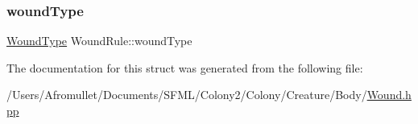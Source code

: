 \subsubsection{\texorpdfstring{wound\+Type}{woundType}}
{\footnotesize\ttfamily \mbox{\hyperlink{_enum_types_8hpp_a585daaeecd1f9f1350c24bf0081a734e}{Wound\+Type}} Wound\+Rule\+::wound\+Type}



The documentation for this struct was generated from the following file\+:\begin{DoxyCompactItemize}
\item 
/\+Users/\+Afromullet/\+Documents/\+S\+F\+M\+L/\+Colony2/\+Colony/\+Creature/\+Body/\mbox{\hyperlink{_wound_8hpp}{Wound.\+hpp}}\end{DoxyCompactItemize}
